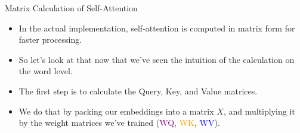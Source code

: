 \documentclass[handout]{beamer}
\begin{document}
\begin{frame}{Matrix Calculation of Self-Attention}
\begin{scriptsize}
\begin{itemize}

\item  In the actual implementation, self-attention is computed in matrix form for faster processing.
\item So let’s look at that now that we’ve seen the intuition of the calculation on the word level.

\item The first step is to calculate the Query, Key, and Value matrices. 

\item We do that by packing our embeddings into a matrix $X$, and multiplying it by the weight matrices we’ve trained (\textcolor{purple}{WQ}, \textcolor{orange}{WK}, \textcolor{blue}{WV}).


\end{itemize}

\end{scriptsize}

\end{frame}
\end{document}
